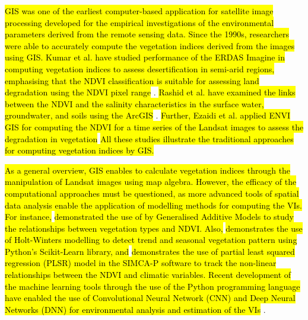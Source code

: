 \documentclass[jimaging,article,submit,pdftex,moreauthors]{Definitions/mdpi}
\begin{document}
\hl{GIS was one of the earliest computer-based application for satellite image processing developed for the empirical investigations of the environmental parameters derived from the remote sensing data. Since the 1990s, researchers were able to accurately compute the vegetation indices derived from the images using GIS. Kumar et al. have studied performance of the ERDAS Imagine in computing vegetation indices to assess desertification in semi-arid regions, emphasising that the NDVI classification is suitable for assessing land degradation using the NDVI pixel range} \cite{KUMAR2022100578}. \hl{Rashid et al. have examined the links between the NDVI and the salinity characteristics in the surface water, groundwater, and soils using the ArcGIS} \cite{RASHID2023100314}. \hl{Further, Ezaidi et al. applied ENVI GIS for computing the NDVI for a time series of the Landsat images to assess the degradation in vegetation} \cite{EZAIDI2022100800} \hl{All these studies illustrate the traditional approaches for computing vegetation indices by GIS.}

\hl{As a general overview, GIS enables to calculate vegetation indices through the manipulation of Landsat images using map algebra. However, the efficacy of the computational approaches must be questioned, as more advanced tools of spatial data analysis enable the application of modelling methods for computing the VIs. For instance,} \cite{MARTINEZ2023115155} \hl{demonstrated the use of by Generalised Additive Models to study the relationships between vegetation types and NDVI. Also, }\cite{OMAR2021e01020}\hl{ demonstrates the use of Holt-Winters modelling to detect trend and seasonal vegetation pattern using Python's Scikit-Learn library, and} \cite{WANG2022102704} \hl{demonstrates the use of partial least squared regression (PLSR) model in the SIMCA-P software to track the non-linear relationships between the NDVI and climatic variables. Recent development of the machine learning tools through the use of the Python programming language have enabled the use of Convolutional Neural Network (CNN) and Deep Neural Networks (DNN) for environmental analysis and estimation of the VIs} \cite{BARRIGUINHA2022103069,ROY2021100582,LI2022102818,DAVIDSON2022107396}. 
\end{document}
